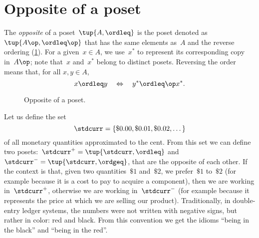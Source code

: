 \section{Opposite of a poset}\label{sec:opposite-of-a-poset}

\begin{definition}\label{def:poset-opposite}
    The \emph{opposite} of a poset~$\tup{A, \ordleq} $ is the poset denoted as~$\tup{A\op, \ordleq\op}$ that has the same elements as~$A$ and the reverse ordering (\cref{fig:opposite}).
    For a given~$x \in A$, we use~$x^*$ to represent its corresponding copy in~$A\op$; note that~$x$ and~$x^*$ belong to distinct posets.
    Reversing the order means that, for all $x,y\in A$,
    \begin{equation}
        x \ordleq y \quad \Leftrightarrow \quad y^* \ordleq\op x^*.
    \end{equation}
\end{definition}

\begin{figure}[tbh]
    \centering
    \caption{Opposite of a poset.\label{fig:opposite}}
\end{figure}


\begin{example}
    Let us define the set
    \begin{equation*}
        \stdcurr=\{\$0.00,\$0.01,\$0.02,\dots\}
    \end{equation*}
    of all \stdcurr monetary quantities approximated to the cent.
    From this set we can define two posets:~$\stdcurr^{+} = \tup{\stdcurr, \ordleq}$ and~$\stdcurr^{-} = \tup{\stdcurr, \ordgeq}$, that are the opposite of each other.
    If the context is that, given two quantities~$\$1$ and~$\$2$, we prefer~$\$1$ to~$\$2$ (for example because it is a cost to pay to acquire a component), then we are working in~$\stdcurr^{+}$, otherwise we are working in~$\stdcurr^{-}$ (for example because it represents the price at which we are selling our product).
    Traditionally, in double-entry ledger systems, the numbers were not written with negative signs, but rather in color: red and black. From this convention we get the idioms ``being in the black'' and ``being in the red''.
\end{example}
